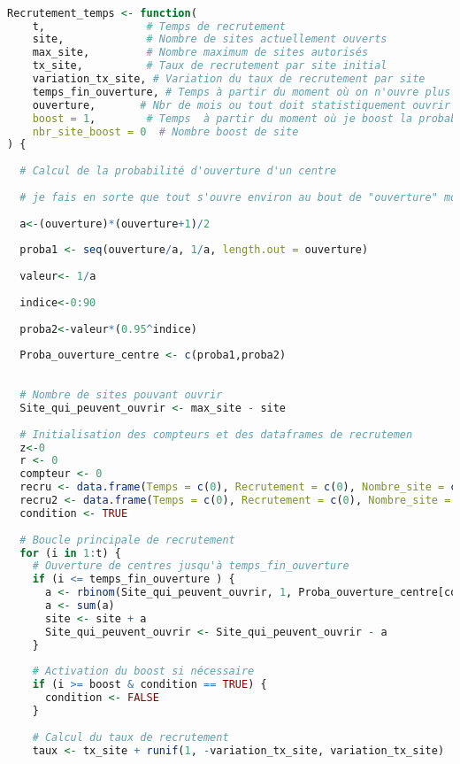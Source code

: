 \documentclass{article}
\begin{document}
\begin{lstlisting}[language=R] %ici tu peux mettre du code R c'est pratique (je t'ai mis une fonction à moi en exemple)

Recrutement_temps <- function(
    t,                # Temps de recrutement
    site,             # Nombre de sites actuellement ouverts
    max_site,         # Nombre maximum de sites autorisés
    tx_site,          # Taux de recrutement par site initial
    variation_tx_site, # Variation du taux de recrutement par site
    temps_fin_ouverture, # Temps à partir du moment où on n'ouvre plus de centre 
    ouverture,       # Nbr de mois ou tout doit statistiquement ouvrir
    boost = 1,        # Temps  à partir du moment où je boost la probabilité du tx_site
    nbr_site_boost = 0  # Nombre boost de site
) {
  
  # Calcul de la probabilité d'ouverture d'un centre
  
  # je fais en sorte que tout s'ouvre environ au bout de "ouverture" mois
  
  a<-(ouverture)*(ouverture+1)/2
  
  proba1 <- seq(ouverture/a, 1/a, length.out = ouverture)
  
  valeur<- 1/a
  
  indice<-0:90
  
  proba2<-valeur*(0.95^indice)
  
  Proba_ouverture_centre <- c(proba1,proba2)
  
  
  # Nombre de sites pouvant ouvrir
  Site_qui_peuvent_ouvrir <- max_site - site 
  
  # Initialisation des compteurs et des dataframes de recrutemen
  z<-0
  r <- 0
  compteur <- 0
  recru <- data.frame(Temps = c(0), Recrutement = c(0), Nombre_site = c(site))
  recru2 <- data.frame(Temps = c(0), Recrutement = c(0), Nombre_site = c(site))
  condition <- TRUE
  
  # Boucle principale de recrutement
  for (i in 1:t) {
    # Ouverture de centres jusqu'à temps_fin_ouverture
    if (i <= temps_fin_ouverture ) {
      a <- rbinom(Site_qui_peuvent_ouvrir, 1, Proba_ouverture_centre[compteur + 1])
      a <- sum(a)
      site <- site + a
      Site_qui_peuvent_ouvrir <- Site_qui_peuvent_ouvrir - a
    }
    
    # Activation du boost si nécessaire
    if (i >= boost & condition == TRUE) {
      condition <- FALSE
    }
    
    # Calcul du taux de recrutement
    taux <- tx_site + runif(1, -variation_tx_site, variation_tx_site)
    

\end{lstlisting}
\end{document}
